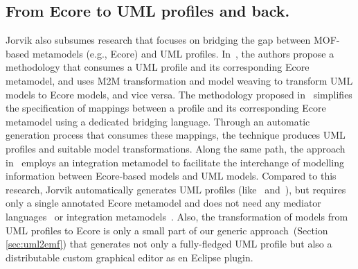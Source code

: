 \subsection{From Ecore to UML profiles and back.}
Jorvik also subsumes research that focuses on bridging the gap between 
MOF-based metamodels (e.g., Ecore) and UML profiles.
In~\cite{abouzahra2005practical}, the authors propose a methodology 
that consumes a UML profile and its corresponding Ecore metamodel, and uses
M2M transformation and model weaving to transform UML models to 
Ecore models, and vice versa. The methodology proposed 
in~\cite{Wimmer2009:IJWIS} simplifies the specification of mappings 
between a profile and its corresponding Ecore metamodel using a dedicated 
bridging language. Through an automatic generation process that consumes
these mappings, the technique produces UML profiles and suitable model 
transformations. 
Along the same path, the approach in~\cite{Giachetti2009:ICRCIS} employs an 
integration metamodel to facilitate the interchange of modelling information 
between Ecore-based models and UML models. Compared to this research, Jorvik automatically generates UML 
profiles (like~\cite{Wimmer2009:IJWIS} 
and~\cite{Giachetti2009:ICRCIS}), but requires only a single annotated Ecore 
metamodel and does not need any mediator 
languages~\cite{Wimmer2009:IJWIS} 
or integration metamodels~\cite{Giachetti2009:ICRCIS}. Also, the transformation 
of models from UML profiles to Ecore is only a small part of our generic 
approach~(Section \ref{sec:uml2emf}) that generates not only a fully-fledged 
UML profile but also a distributable custom graphical editor as en Eclipse plugin. 

 




